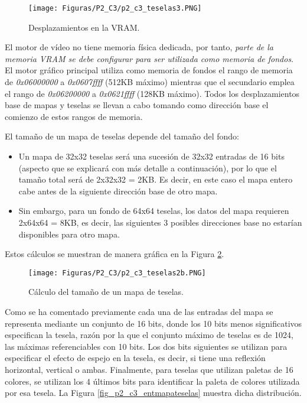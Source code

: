 \begin{figure}[t]
\centering
\texttt{[image: Figuras/P2\_C3/p2\_c3\_teselas3.PNG]}
\caption{Desplazamientos en la VRAM.}
\label{fig_p2_c3_teselas3}
\end{figure}

El motor de vídeo no tiene memoria física dedicada, por tanto, \textit{parte de la memoria VRAM se debe configurar para ser utilizada como memoria de fondos}. El motor gráfico principal utiliza como memoria de fondos el rango de memoria de \textit{0x06000000} a \textit{0x0607ffff} (512KB máximo) mientras que el secundario emplea el rango de \textit{0x06200000} a \textit{0x0621ffff} (128KB máximo). Todos los desplazamientos base de mapas y teselas se llevan a cabo tomando como dirección base el comienzo de estos rangos de memoria.

El tamaño de un mapa de teselas depende del tamaño del fondo:
\begin{itemize}
\item  Un mapa de 32x32 teselas será una sucesión de 32x32 entradas de 16 bits (aspecto que se explicará con más detalle a continuación), por lo que el tamaño total será de 2x32x32 = 2KB. Es decir, en este caso el mapa entero cabe antes de la siguiente dirección base de otro mapa.
%
\item  Sin embargo, para un fondo de 64x64 teselas, los datos del mapa requieren 2x64x64 = 8KB, es decir, las siguientes 3 posibles direcciones base no estarían disponibles para otro mapa.
\end{itemize}

Estos cálculos se muestran de manera gráfica en la Figura \ref{fig_p2_c3_teselas2b}.

\begin{figure}[t]
\centering
\texttt{[image: Figuras/P2\_C3/p2\_c3\_teselas2b.PNG]}
\caption{Cálculo del tamaño de un mapa de teselas.}
\label{fig_p2_c3_teselas2b}
\end{figure}

Como se ha comentado previamente cada una de las entradas del mapa se representa mediante un conjunto de 16 bits, donde los 10 bits menos significativos especifican la tesela, razón por la que el conjunto máximo de teselas es de  1024, las máximas referenciables con 10 bits. Los dos bits siguientes se utilizan para especificar el efecto de espejo en la tesela, es decir, si tiene una reflexión horizontal, vertical o ambas. Finalmente, para teselas que utilizan paletas de 16 colores, se utilizan los 4 últimos bits para identificar la paleta de colores utilizada por esa tesela. La Figura \ref{fig_p2_c3_entmapateselas} muestra dicha distribución.

